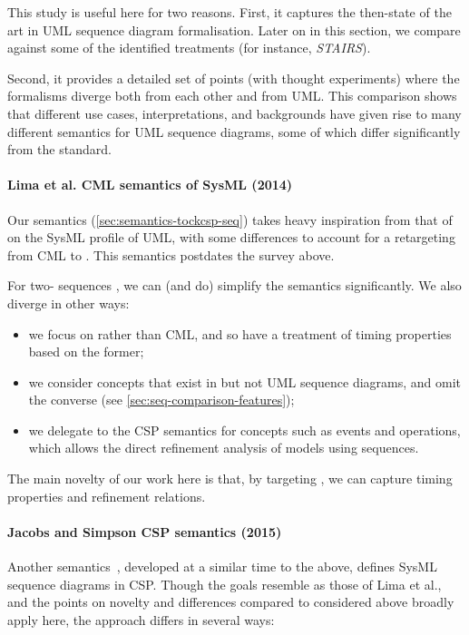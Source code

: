 This study is useful here for two reasons.  First, it captures the then-state of
the art in UML sequence diagram formalisation.  Later on in this section,
we compare against some of the identified treatments (for instance,
\emph{STAIRS}).

Second, it provides a detailed
set of points (with thought experiments) where the formalisms diverge both from
each other and from UML.
This comparison shows that different use cases, interpretations, and backgrounds
have given rise to many different semantics for UML sequence diagrams, some
of which differ significantly from the standard.

\paragraph{Lima et al. CML semantics of SysML (2014)}

Our \tockcsp{} semantics (\cref{sec:semantics-tockcsp-seq}) takes heavy inspiration
from that of \textcite{lima-semantics} on the SysML profile of UML, with
some differences to account for a retargeting from CML to \tockcsp.  This
semantics postdates the survey above.

For two-\mactor{} sequences , we can (and do)
simplify the semantics significantly.  We also diverge in other ways:

\begin{itemize}
\item we focus on \tockcsp{} rather than CML, and so have a
  treatment of timing properties based on the former;
\item
  we consider concepts that exist in \langname{} but not UML sequence
  diagrams, and omit the converse
  (see \cref{sec:seq-comparison-features});
\item
  we delegate to the \robostar{} CSP semantics for concepts such as events and
  operations, which allows the direct refinement analysis of \robostar{} models
  using sequences.
\end{itemize}

The main novelty of our work here is that, by targeting \tockcsp, we can capture
timing properties and refinement relations.

\paragraph{Jacobs and Simpson CSP semantics (2015)}

Another semantics~\cite{Jacobs15-SeqCSP}, developed at a similar time to
the above, defines SysML sequence diagrams in CSP.
Though the goals resemble as those of Lima et al.,
and the points on novelty and differences compared to \langname{} considered
above broadly apply here, the approach differs in several ways:

